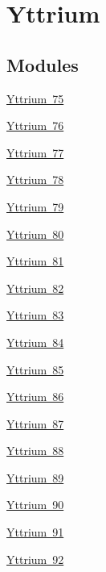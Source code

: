 \hypertarget{group___isotope_const-_yttrium}{}\section{Yttrium}
\label{group___isotope_const-_yttrium}
\subsection*{Modules}
\begin{DoxyCompactItemize}
\item 
\mbox{\hyperlink{group___isotope_const-_yttrium-_y75}{Yttrium 75}}
\item 
\mbox{\hyperlink{group___isotope_const-_yttrium-_y76}{Yttrium 76}}
\item 
\mbox{\hyperlink{group___isotope_const-_yttrium-_y77}{Yttrium 77}}
\item 
\mbox{\hyperlink{group___isotope_const-_yttrium-_y78}{Yttrium 78}}
\item 
\mbox{\hyperlink{group___isotope_const-_yttrium-_y79}{Yttrium 79}}
\item 
\mbox{\hyperlink{group___isotope_const-_yttrium-_y80}{Yttrium 80}}
\item 
\mbox{\hyperlink{group___isotope_const-_yttrium-_y81}{Yttrium 81}}
\item 
\mbox{\hyperlink{group___isotope_const-_yttrium-_y82}{Yttrium 82}}
\item 
\mbox{\hyperlink{group___isotope_const-_yttrium-_y83}{Yttrium 83}}
\item 
\mbox{\hyperlink{group___isotope_const-_yttrium-_y84}{Yttrium 84}}
\item 
\mbox{\hyperlink{group___isotope_const-_yttrium-_y85}{Yttrium 85}}
\item 
\mbox{\hyperlink{group___isotope_const-_yttrium-_y86}{Yttrium 86}}
\item 
\mbox{\hyperlink{group___isotope_const-_yttrium-_y87}{Yttrium 87}}
\item 
\mbox{\hyperlink{group___isotope_const-_yttrium-_y88}{Yttrium 88}}
\item 
\mbox{\hyperlink{group___isotope_const-_yttrium-_y89}{Yttrium 89}}
\item 
\mbox{\hyperlink{group___isotope_const-_yttrium-_y90}{Yttrium 90}}
\item 
\mbox{\hyperlink{group___isotope_const-_yttrium-_y91}{Yttrium 91}}
\item 
\mbox{\hyperlink{group___isotope_const-_yttrium-_y92}{Yttrium 92}}
\item 

\end{DoxyCompactItemize}
